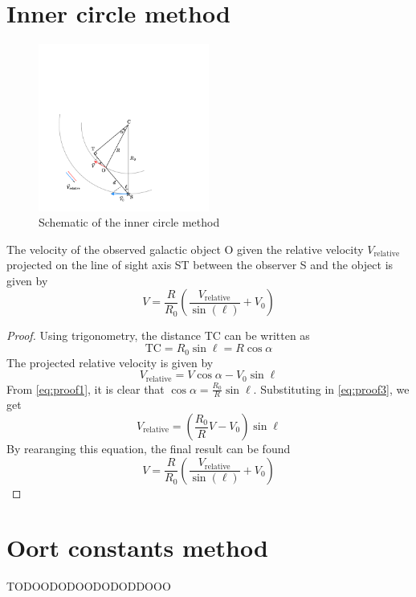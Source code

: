 \section{Inner circle method}
\label{sec:proof_inner_circle}
\begin{figure}[htbp]
    \centering
    \includegraphics[width=0.5\textwidth]{figures/inner_circle_method.pdf}
    \caption{Schematic of the inner circle method}
    \label{fig:inner_circle_method}
\end{figure}
%
The velocity of the observed galactic object O given the relative velocity $V_\textrm{relative}$ projected on the line of sight axis ST between the observer S and the object is given by
\begin{equation}
    V = \frac{R}{R_0} \left( \frac{V_\textrm{relative}}{\sin(\ell)} + V_0 \right)
\end{equation}
\begin{proof}
    Using trigonometry, the distance TC can be written as
    \begin{equation}
       \textrm{TC} = R_0 \sin\ell = R \cos\alpha
       \label{eq:proof1}
    \end{equation}
    The projected relative velocity is given by
    \begin{equation}
        V_\textrm{relative} = V \cos\alpha - V_0 \sin\ell
       \label{eq:proof3}
    \end{equation}
    From \autoref{eq:proof1}, it is clear that $\cos\alpha = \frac{R_0}{R} \sin\ell$. Substituting in \autoref{eq:proof3}, we get
    \begin{equation}
        V_\textrm{relative} = \left( \frac{R_0}{R} V - V_0 \right) \sin\ell
    \end{equation}
    By rearanging this equation, the final result can be found
    \begin{equation}
        V = \frac{R}{R_0} \left( \frac{V_\textrm{relative}}{\sin(\ell)} + V_0 \right)
    \end{equation}
\end{proof}

\section{Oort constants method}
\label{sec:oort_method}

TODOODODOODODODDOOO